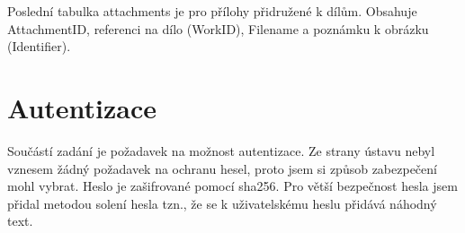         Poslední tabulka attachments je pro přílohy přidružené k dílům. Obsahuje AttachmentID, referenci na dílo (WorkID), Filename a poznámku k obrázku (Identifier).
        
    \section{Autentizace} \label{autentizace}
        Součástí zadání je požadavek na možnost autentizace. Ze strany ústavu nebyl vznesem žádný požadavek na ochranu hesel, proto jsem si způsob zabezpečení mohl vybrat. Heslo je zašifrované pomocí sha256. Pro větší bezpečnost hesla jsem přidal metodou solení hesla tzn., že se k uživatelskému heslu přidává náhodný text.
        

